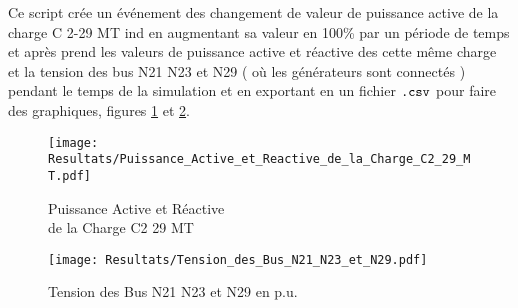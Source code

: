 Ce script crée un événement des changement de valeur de puissance active de la charge C 2-29 MT ind en augmentant sa valeur en 100\% par un période de temps et après prend les valeurs de puissance active et réactive des cette même charge et la tension des bus N21 N23 et N29 ( où les générateurs sont connectés ) pendant le temps de la simulation et en exportant en un fichier $ \verb|.csv| $ pour faire des graphiques, figures \ref{fig:Puissance_Active_et_Reactive_de_la_Charge_C2_29_MT} et \ref{fig:Tension_des_Bus_N21_N23_et_N29}.\\
\begin{minipage}{.5\textwidth}
	
	\begin{figure}[H]
		\begin{center}
			\captionsetup{justification=centering,margin=.5cm}	
			\texttt{[image: Resultats/Puissance\_Active\_et\_Reactive\_de\_la\_Charge\_C2\_29\_MT.pdf]}
			\caption{Puissance Active et Réactive \\de la Charge C2 29 MT}
			\label{fig:Puissance_Active_et_Reactive_de_la_Charge_C2_29_MT}
		\end{center}
	\end{figure}
	
\end{minipage}
\begin{minipage}{.5\textwidth}
	\begin{figure}[H]
		\begin{center}
			\captionsetup{justification=centering,margin=.5cm}	
			\texttt{[image: Resultats/Tension\_des\_Bus\_N21\_N23\_et\_N29.pdf]}
			\caption{Tension des Bus N21 N23 et N29 en p.u.}
			\label{fig:Tension_des_Bus_N21_N23_et_N29}
		\end{center}
	\end{figure}
\end{minipage}
